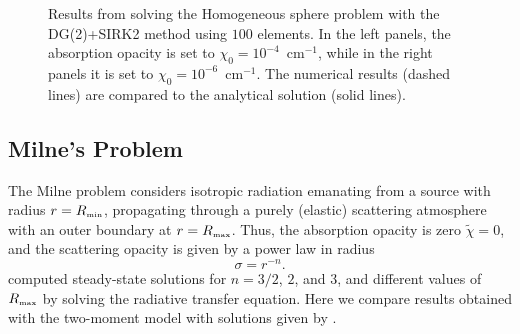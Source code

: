 \documentclass[10pt,preprint]{aastex}
\begin{document}
\begin{figure}
\begin{center}
\begin{tabular}{cc}
    \end{tabular}
  \end{center}
  \caption{Results from solving the Homogeneous sphere problem with the DG(2)+SIRK2 method using $100$ elements.  
  In the left panels, the absorption opacity is set to $\chi_{0}=10^{-4}$~cm$^{-1}$, while in the right panels it is set to $\chi_{0}=10^{-6}$~cm$^{-1}$.  
  The numerical results (dashed lines) are compared to the analytical solution (solid lines).}
  \label{fig:homogeneousSphere1D}
\end{figure}

\subsection{Milne's Problem}

The Milne problem \citep[see, e.g.,][for details]{hummerRybicki_1971} considers isotropic radiation emanating from a source with radius $r=R_{\mbox{\tiny min}}$, propagating through a purely (elastic) scattering atmosphere with an outer boundary at $r=R_{\mbox{\tiny max}}$.  
Thus, the absorption opacity is zero $\tilde{\chi}=0$, and the scattering opacity is given by a power law in radius
\begin{equation}
  \sigma=r^{-n}.  
  \label{eq:opacityMilne}
\end{equation}
\citet{hummerRybicki_1971} computed steady-state solutions for $n=3/2$, $2$, and $3$, and different values of $R_{\mbox{\tiny max}}$ by solving the radiative transfer equation.  
Here we compare results obtained with the two-moment model with solutions given by \citet{hummerRybicki_1971}.  
\end{document}
